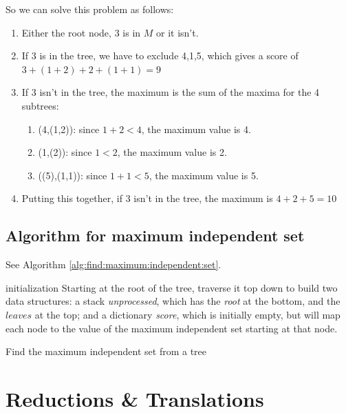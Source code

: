 \documentclass[]{article}
\begin{document}
So we can solve this problem as follows:
\begin{enumerate}
	\item Either the root node, $3$ is in $M$ or it isn't.
	\item If $3$ is in the tree, we have to exclude {4,1,5}, which gives a score of $3+(1+2)+2+(1+1)=9$
	\item If $3$ isn't in the tree, the maximum is the sum of the maxima for the 4 subtrees:
	\begin{enumerate}
		\item (4,(1,2)): since $1+2<4$, the maximum value is 4.
		\item (1,(2)): since $1<2$, the maximum value is 2. 
		\item ((5),(1,1)): since $1+1<5$, the maximum value is 5.
	\end{enumerate}
	\item Putting this together, if $3$ isn't in the tree, the maximum is $4+2+5=10$
\end{enumerate}

\subsection{Algorithm for maximum independent set}

See Algorithm \ref{alg:find:maximum:independent:set}.

\begin{algorithm}[H]
	initialization\;
	Starting at the root of the tree, traverse it top down to build two data structures: a stack \emph{unprocessed}, which has the \emph{root} at the bottom, and the $leaves$ at the top; and a dictionary \emph{score}, which is initially empty, but will map each node to the value of the maximum independent set starting at that node.\;
	\caption{Find the maximum independent set from a tree}\label{alg:find:maximum:independent:set}
\end{algorithm}

\section{Reductions \& Translations }



%
%
\end{document}
